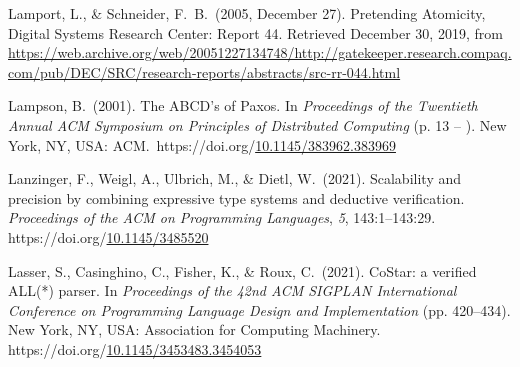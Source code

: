 \documentclass[12pt,twoside]{article}
\begin{document}
{\begin{thebibliography}{1079}
\mdbibitemlabel{}Lamport, L., \& Schneider, F.~B.~(2005, December 27). Pretending Atomicity, Digital Systems Research Center: Report 44. Retrieved December 30, 2019, from \href{https://web.archive.org/web/20051227134748/http://gatekeeper.research.compaq.com/pub/DEC/SRC/research-reports/abstracts/src-rr-044.html}{{\ttfamily https://\hspace{0pt}web.\hspace{0pt}archive.\hspace{0pt}org/\hspace{0pt}web/\hspace{0pt}20051227134748/\hspace{0pt}http://\hspace{0pt}gatekeeper.\hspace{0pt}research.\hspace{0pt}compaq.\hspace{0pt}com/\hspace{0pt}pub/\hspace{0pt}DEC/\hspace{0pt}SRC/\hspace{0pt}research-\hspace{0pt}reports/\hspace{0pt}abstracts/\hspace{0pt}src-\hspace{0pt}rr-\hspace{0pt}044.\hspace{0pt}html}}%

\mdbibitemlabel{}Lampson, B.~(2001). The ABCD’s of Paxos. In \emph{Proceedings of the Twentieth Annual ACM Symposium on Principles of Distributed Computing} (p. 13 – ). New York, NY, USA: ACM.~https://doi.org/\href{https://dx.doi.org/10.1145/383962.383969}{10.1145/383962.383969}%

\mdbibitemlabel{}Lanzinger, F., Weigl, A., Ulbrich, M., \& Dietl, W.~(2021). Scalability and precision by combining expressive type systems and deductive verification. \emph{Proceedings of the ACM on Programming Languages}, \emph{5}, 143:1–143:29. https://doi.org/\href{https://dx.doi.org/10.1145/3485520}{10.1145/3485520}%

\mdbibitemlabel{}Lasser, S., Casinghino, C., Fisher, K., \& Roux, C.~(2021). CoStar: a verified ALL(*) parser. In \emph{Proceedings of the 42nd ACM SIGPLAN International Conference on Programming Language Design and Implementation} (pp. 420–434). New York, NY, USA: Association for Computing Machinery. https://doi.org/\href{https://dx.doi.org/10.1145/3453483.3454053}{10.1145/3453483.3454053}%


\end{thebibliography}}
\end{document}
